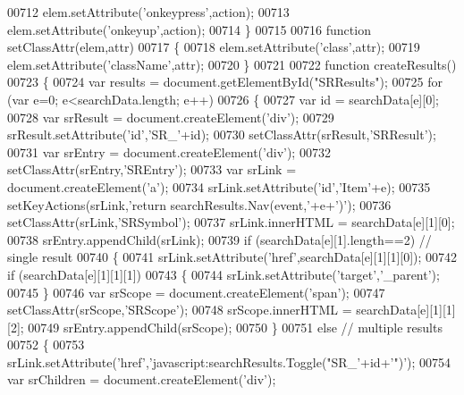 \begin{DoxyCode}
00712   elem.setAttribute(\textcolor{stringliteral}{'onkeypress'},action);
00713   elem.setAttribute(\textcolor{stringliteral}{'onkeyup'},action);
00714 \}
00715 
00716 \textcolor{keyword}{function} setClassAttr(elem,attr)
00717 \{
00718   elem.setAttribute(\textcolor{stringliteral}{'class'},attr);
00719   elem.setAttribute(\textcolor{stringliteral}{'className'},attr);
00720 \}
00721 
00722 \textcolor{keyword}{function} createResults()
00723 \{
00724   var results = document.getElementById(\textcolor{stringliteral}{"SRResults"});
00725   \textcolor{keywordflow}{for} (var e=0; e<searchData.length; e++)
00726   \{
00727     var \textcolor{keywordtype}{id} = searchData[e][0];
00728     var srResult = document.createElement(\textcolor{stringliteral}{'div'});
00729     srResult.setAttribute(\textcolor{stringliteral}{'id'},\textcolor{stringliteral}{'SR\_'}+\textcolor{keywordtype}{id});
00730     setClassAttr(srResult,\textcolor{stringliteral}{'SRResult'});
00731     var srEntry = document.createElement(\textcolor{stringliteral}{'div'});
00732     setClassAttr(srEntry,\textcolor{stringliteral}{'SREntry'});
00733     var srLink = document.createElement(\textcolor{charliteral}{'a'});
00734     srLink.setAttribute(\textcolor{stringliteral}{'id'},\textcolor{stringliteral}{'Item'}+e);
00735     setKeyActions(srLink,\textcolor{stringliteral}{'return searchResults.Nav(event,'}+e+\textcolor{charliteral}{')'});
00736     setClassAttr(srLink,\textcolor{stringliteral}{'SRSymbol'});
00737     srLink.innerHTML = searchData[e][1][0];
00738     srEntry.appendChild(srLink);
00739     \textcolor{keywordflow}{if} (searchData[e][1].length==2) \textcolor{comment}{// single result}
00740     \{
00741       srLink.setAttribute(\textcolor{stringliteral}{'href'},searchData[e][1][1][0]);
00742       \textcolor{keywordflow}{if} (searchData[e][1][1][1])
00743       \{
00744        srLink.setAttribute(\textcolor{stringliteral}{'target'},\textcolor{stringliteral}{'\_parent'});
00745       \}
00746       var srScope = document.createElement(\textcolor{stringliteral}{'span'});
00747       setClassAttr(srScope,\textcolor{stringliteral}{'SRScope'});
00748       srScope.innerHTML = searchData[e][1][1][2];
00749       srEntry.appendChild(srScope);
00750     \}
00751     \textcolor{keywordflow}{else} \textcolor{comment}{// multiple results}
00752     \{
00753       srLink.setAttribute(\textcolor{stringliteral}{'href'},\textcolor{stringliteral}{'javascript:searchResults.Toggle("SR\_'}+\textcolor{keywordtype}{id}+\textcolor{stringliteral}{'")'});
00754       var srChildren = document.createElement(\textcolor{stringliteral}{'div'});

\end{DoxyCode}
